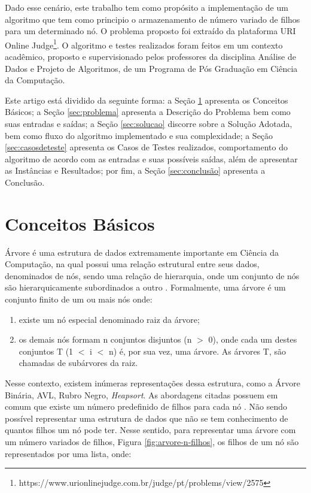 \documentclass[12pt]{article}
\begin{document}
Dado esse cenário, este trabalho tem como propósito a implementação de um algoritmo que tem como principio o armazenamento de número variado de filhos para um determinado nó. O problema proposto foi extraído da plataforma URI Online Judge\footnote{https://www.urionlinejudge.com.br/judge/pt/problems/view/2575}. O algoritmo e testes realizados foram feitos em um contexto acadêmico, proposto e supervisionado pelos professores da disciplina Análise de Dados e Projeto de Algoritmos, de um Programa de Pós Graduação em Ciência da Computação.

Este artigo está dividido da seguinte forma: a Seção \ref{sec:definicoes} apresenta os Conceitos Básicos; a Seção \ref{sec:problema} apresenta a Descrição do Problema bem como suas entradas e saídas; a Seção \ref{sec:solucao} discorre sobre a Solução Adotada, bem como fluxo do algoritmo implementado e sua complexidade; a Seção \ref{sec:casosdeteste} apresenta os Casos de Testes realizados, comportamento do algoritmo de acordo com as entradas e suas possíveis saídas, além de apresentar as Instâncias e Resultados; por fim, a Seção \ref{sec:conclusão} apresenta a Conclusão.

\section{Conceitos Básicos}\label{sec:definicoes}

Árvore é uma estrutura de dados extremamente importante em Ciência da Computação, na qual possui uma relação estrutural entre seus dados, denominados de nós, sendo uma relação de hierarquia, onde um conjunto de nós são hierarquicamente subordinados a outro \cite{monard1993tecnicas}. Formalmente, uma árvore é um conjunto finito de um ou mais nós onde:  
\begin{enumerate}
    \item existe um nó especial denominado raiz da árvore; 
    \item os demais nós formam n conjuntos disjuntos (n $>$ 0), onde cada um destes conjuntos T (1 $<$ i $<$ n) é, por sua vez, uma árvore. As árvores T, são chamadas de subárvores da raiz. 
\end{enumerate}

Nesse contexto, existem inúmeras representações dessa estrutura, como a Árvore Binária, AVL, Rubro Negro, \textit{Heapsort}. As abordagens citadas possuem em comum que existe um número predefinido de filhos para cada nó \cite{cormen2009introduction}. Não sendo possível representar uma estrutura de dados que não se tem conhecimento de quantos filhos um nó pode ter. Nesse sentido, para representar uma árvore com um número variados de filhos, Figura \ref{fig:arvore-n-filhos}, os filhos de um nó são representados por uma lista, onde:
\end{document}
